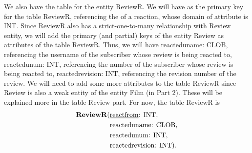 \documentclass{article}
\newcommand{\key}[1]{\underline{\smash{#1}}}
\begin{document}
We also have the table for the entity ReviewR. We will have \key{reactfrom} as
the primary key for the table ReviewR, referencing the \key{id} of a reaction,
whose domain of attribute is INT. Since ReviewR also has a strict-one-to-many
relationship with Review entity, we will add the primary (and partial) keys of
the entity Review as attributes of the table ReviewR. Thus, we will have
reacteduname: CLOB, referencing the username of the subscriber whose review is
being reacted to, reactedunum: INT, referencing the number of the subscriber
whose review is being reacted to, reactedrevision: INT, referencing the revision
number of the review. We will need to add some more attributes to the table
ReviewR since Review is also a weak entity of the entity Film (in Part 2). These
will be explained more in the table Review part. For now, the table ReviewR is
\begin{align*}
    \text{\textbf{ReviewR}(} & \text{\key{reactfrom}: INT,} \\
                             & \text{reacteduname: CLOB,} \\
                             & \text{reactedunum: INT,} \\
                             & \text{reactedrevision: INT).}
\end{align*}
\end{document}
